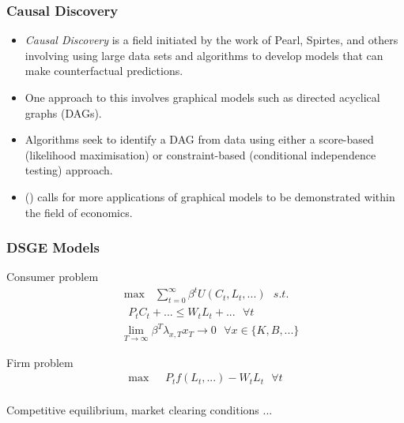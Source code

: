 \documentclass{beamer}
\begin{document}
\begin{frame}
    \frametitle{Causal Discovery}
    \begin{itemize}
        \item \textit{Causal Discovery} is a field initiated by the work of Pearl, Spirtes, and others involving using large data sets and algorithms to develop models that can make counterfactual predictions.
        \item One approach to this involves graphical models such as directed acyclical graphs (DAGs).
        \item Algorithms seek to identify a DAG from data using either a score-based (likelihood maximisation) or constraint-based (conditional independence testing) approach.
        \item \citeauthor{imbens2019potential} (\citeyear{imbens2019potential}) calls for more applications of graphical models to be demonstrated within the field of economics.
    \end{itemize}
\end{frame}

\begin{frame}
    \frametitle{DSGE Models}
    \begin{minipage}{0.4\textwidth}
        \centering
        Consumer problem
        \begin{align*}
            & \max \text{ } \sum_{t=0}^{\infty} \beta^t U(C_t, L_t, ...) \text{ } s.t. \\
            & \text{ } P_t C_t + ... \leq W_t L_t + ... \text{ } \forall t \\
            & \lim_{T \rightarrow \infty} \beta^T \lambda_{x,T} x_T \rightarrow 0 \text{ } \forall x \in \{K, B, ...\}
        \end{align*}
    \end{minipage}
    \begin{minipage}{0.4\textwidth}
        \centering
        Firm problem
        \begin{align*}
            \max \text{ } & P_t f(L_t, ...) - W_t L_t \text{ } \forall t \\
        \end{align*}
    \end{minipage}
    \centering
    Competitive equilibrium, market clearing conditions ...
\end{frame}
\end{document}
